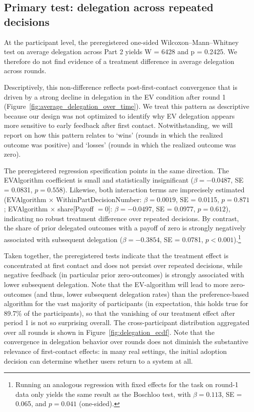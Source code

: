 \documentclass[a4paper, 12pt, fleqn]{article}
\theoremstyle{definition}
\begin{document}
\subsection{Primary test: delegation across repeated decisions}
At the participant level, the preregistered one-sided Wilcoxon--Mann--Whitney test on average delegation across Part 2 yields W = 6428 and p = 0.2425. We therefore do not find evidence of a treatment difference in average delegation across rounds.

Descriptively, this non-difference reflects post-first-contact convergence that is driven by a strong decline in delegation in the EV condition after round 1 (Figure~\ref{fig:average_delegation_over_time}). We treat this pattern as descriptive because our design was not optimized to identify why EV delegation appears more sensitive to early feedback after first contact. Notwithstanding, we will report on how this pattern relates to `wins' (rounds in which the realized outcome was positive) and `losses' (rounds in which the realized outcome was zero).

The preregistered regression specification points in the same direction. The EVAlgorithm coefficient is small and statistically insignificant ($\beta = -0.0487$, SE = 0.0831, $p = 0.558$). Likewise, both interaction terms are imprecisely estimated (EVAlgorithm $\times$ WithinPartDecisionNumber: $\beta = 0.0019$, SE = 0.0115, $p = 0.871$; EVAlgorithm $\times$ share[Payoff $= 0$]: $\beta = -0.0497$, SE = 0.0977, $p = 0.612$), indicating no robust treatment difference over repeated decisions. By contrast, the share of prior delegated outcomes with a payoff of zero is strongly negatively associated with subsequent delegation ($\beta = -0.3854$, SE = 0.0781, $p < 0.001$).\footnote{Running an analogous regression with fixed effects for the task on round-1 data only yields the same result as the Boschloo test, with $\beta = 0.113$, SE = 0.065, and $p = 0.041$ (one-sided).}

Taken together, the preregistered tests indicate that the treatment effect is concentrated at first contact and does not persist over repeated decisions, while negative feedback (in particular prior zero-outcomes) is strongly associated with lower subsequent delegation. Note that the EV-algorithm will lead to more zero-outcomes (and thus, lower subsequent delegation rates) than the preference-based algorithm for the vast majority of participants (in expectation, this holds true for 89.7\% of the participants), so that the vanishing of our treatment effect after period 1 is not so surprising overall.
The cross-participant distribution aggregated over all rounds is shown in Figure~\ref{fig:delegation_ecdf}. Note that the convergence in delegation behavior over rounds does not diminish the substantive relevance of first-contact effects: in many real settings, the initial adoption decision can determine whether users return to a system at all.
\end{document}
